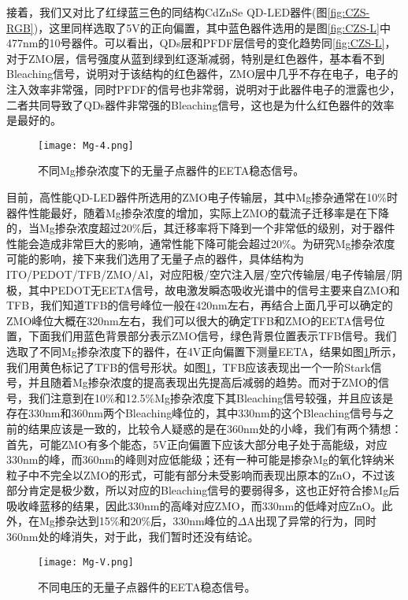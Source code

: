 接着，我们又对比了红绿蓝三色的同结构CdZnSe QD-LED器件(图\ref{fig:CZS-RGB})，这里同样选取了5V的正向偏置，其中蓝色器件选用的是图\ref{fig:CZS-L}中477nm的10号器件。可以看出，QDs层和PFDF层信号的变化趋势同\ref{fig:CZS-L}，对于ZMO层，信号强度从蓝到绿到红逐渐减弱，特别是红色器件，基本看不到Bleaching信号，说明对于该结构的红色器件，ZMO层中几乎不存在电子，电子的注入效率非常强，同时PFDF的信号也非常弱，说明对于此器件电子的泄露也少，二者共同导致了QDs器件非常强的Bleaching信号，这也是为什么红色器件的效率是最好的。
\begin{figure}[ht]
	\centering
	\texttt{[image: Mg-4.png]}
	\caption{不同Mg掺杂浓度下的无量子点器件的EETA稳态信号。}
	\label{fig:Mg-4}
\end{figure}

目前，高性能QD-LED器件所选用的ZMO电子传输层，其中Mg掺杂通常在10\%时器件性能最好，随着Mg掺杂浓度的增加，实际上ZMO的载流子迁移率是在下降的，当Mg掺杂浓度超过20\%后，其迁移率将下降到一个非常低的级别，对于器件性能会造成非常巨大的影响，通常性能下降可能会超过20\%。为研究Mg掺杂浓度可能的影响，接下来我们选用了无量子点的器件，具体结构为ITO/PEDOT/TFB/ZMO/Al，对应阳极/空穴注入层/空穴传输层/电子传输层/阴极，其中PEDOT无EETA信号，故电激发瞬态吸收光谱中的信号主要来自ZMO和TFB，我们知道TFB的信号峰位一般在420nm左右，再结合上面几乎可以确定的ZMO峰位大概在320nm左右，我们可以很大的确定TFB和ZMO的EETA信号位置，下面我们用蓝色背景部分表示ZMO信号，绿色背景位置表示TFB信号。我们选取了不同Mg掺杂浓度下的器件，在4V正向偏置下测量EETA，结果如图\ref{fig:Mg-4}所示，我们用黄色标记了TFB的信号形状。如图\ref{fig:Mg-4}，TFB应该表现出一个一阶Stark信号，并且随着Mg掺杂浓度的提高表现出先提高后减弱的趋势。而对于ZMO的信号，我们注意到在10\%和12.5\%Mg掺杂浓度下其Bleaching信号较强，并且应该是存在330nm和360nm两个Bleaching峰位的，其中330nm的这个Bleaching信号与之前的结果应该是一致的，比较令人疑惑的是在360nm处的小峰，我们有两个猜想：首先，可能ZMO有多个能态，5V正向偏置下应该大部分电子处于高能级，对应330nm的峰，而360nm的峰则对应低能级；还有一种可能是掺杂Mg的氧化锌纳米粒子中不完全以ZMO的形式，可能有部分未受影响而表现出原本的ZnO，不过该部分肯定是极少数，所以对应的Bleaching信号的要弱得多，这也正好符合掺Mg后吸收峰蓝移的结果，因此330nm的高峰对应ZMO，而330nm的低峰对应ZnO。此外，在Mg掺杂达到15\%和20\%后，330nm峰位的$\Delta$A出现了异常的行为，同时360nm处的峰消失，对于此，我们暂时还没有结论。
\begin{figure}[ht]
	\centering
	\texttt{[image: Mg-V.png]}
	\caption{不同电压的无量子点器件的EETA稳态信号。}
	\label{fig:Mg-V}
\end{figure}

